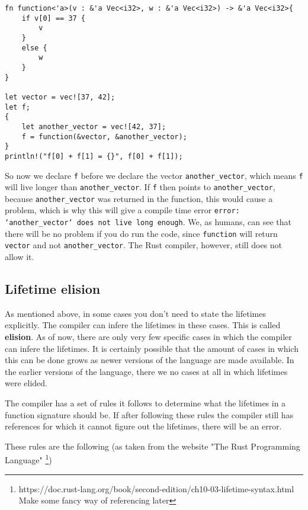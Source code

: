 \begin{verbatim}
fn function<'a>(v : &'a Vec<i32>, w : &'a Vec<i32>) -> &'a Vec<i32>{
    if v[0] == 37 {
        v
    }
    else {
        w
    }
}

let vector = vec![37, 42];
let f;
{
    let another_vector = vec![42, 37];
    f = function(&vector, &another_vector);
}
println!("f[0] + f[1] = {}", f[0] + f[1]);
\end{verbatim}

So now we declare \verb|f| before we declare the vector \verb|another_vector|, which means \verb|f| will live longer than \verb|another_vector|. If \verb|f| then points to \verb|another_vector|, because \verb|another_vector| was returned in the function, this would cause a problem, which is why this will give a compile time error \texttt{error: `another\_vector` does not live long enough}. We, as humans, can see that there will be no problem if you do run the code, since \verb|function| will return \verb|vector| and not \verb|another_vector|. The Rust compiler, however, still does not allow it. 

\subsection{Lifetime elision}
As mentioned above, in some cases you don't need to state the lifetimes explicitly. The compiler can infere the lifetimes in these cases. This is called \textbf{elision}. As of now, there are only very few specific cases in which the compiler can infere the lifetimes. It is certainly possible that the amount of cases in which this can be done grows as newer versions of the language are made available. In the earlier versions of the language, there we no cases at all in which lifetimes were elided. 

The compiler has a set of rules it follows to determine what the lifetimes in a function signature should be. If after following these rules the compiler still has references for which it cannot figure out the lifetimes, there will be an error. 

These rules are the following (as taken from the website "The Rust Programming Language" \footnote{https://doc.rust-lang.org/book/second-edition/ch10-03-lifetime-syntax.html Make some fancy way of referencing later})

